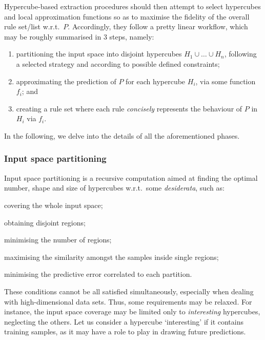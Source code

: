 \documentclass[
]{ceurart}
\begin{document}
Hypercube-based extraction procedures should then attempt to select hypercubes and local approximation functions so as to maximise the fidelity of the overall rule set/list w.r.t.\ $P$.
%
Accordingly, they follow a pretty linear workflow, which may be roughly summarised in 3 steps, namely:
%
\begin{enumerate}
	\item partitioning the input space into disjoint hypercubes $H_1 \cup \ldots \cup H_n$, following a selected strategy and according to possible defined constraints;
	\item approximating the prediction of $P$ for each hypercube $H_i$, via some function $f_i$; and
	\item creating a rule set where each rule \emph{concisely} represents the behaviour of $P$ in $H_i$ via $f_i$.
\end{enumerate}
%
In the following, we delve into the details of all the aforementioned phases.

\subsubsection{Input space partitioning}

Input space partitioning is a recursive computation aimed at finding the optimal number, shape and size of hypercubes w.r.t.\ some \emph{desiderata}, such as:
%
\begin{inlinelist}
	\item covering the whole input space;
	\item obtaining disjoint regions;
	\item minimising the number of regions;
	\item maximising the similarity amongst the samples inside single regions;
	\item minimising the predictive error correlated to each partition.
\end{inlinelist}

These conditions cannot be all satisfied simultaneously, especially when dealing with high-dimensional data sets.
%
Thus, some requirements may be relaxed.
%
For instance, the input space coverage may be limited only to \emph{interesting} hypercubes, neglecting the others.
%
Let us consider a hypercube `interesting' if it contains training samples, as it may have a role to play in drawing future predictions.
\end{document}
